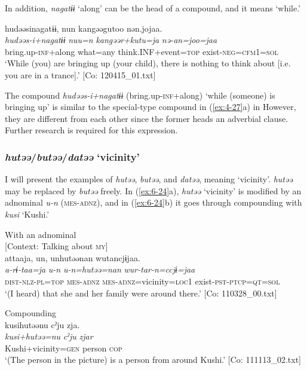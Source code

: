 In addition, \textit{nagatɨɨ} ‘along’ can be the head of a compound, and it means ‘while.’

\ea\label{ex:6-23}
{\TM}
\glll hudəəsinagatɨɨ,  nun  kangəəgutoo  nən.jojaa.\\
\textit{hudəəs-i+nagatɨɨ}  \textit{nuu=n}  \textit{kangəər+kutu=ja}  \textit{nə-an=joo=jaa}\\
    bring.up-\textsc{inf}+along  what=any  think.INF+event=\textsc{top}  exist-\textsc{neg}=\textsc{cfm}1=\textsc{sol}\\
\glt    ‘While (you) are bringing up (your child), there is nothing to think about [i.e. you are in a trance].’ [Co: 120415\_01.txt]
\z

The compound \textit{hudəəs-i+nagatɨɨ} (bring.up-\textsc{inf}+along) ‘while (someone) is bringing up’ is similar to the special-type compound in (\ref{ex:4-27}a) in  However, they are different from each other since the former heads an adverbial clause. Further research is required for this expression.

\subsubsection{\textit{hutəə}/\textit{butəə}/\textit{datəə} ‘vicinity’}

I will present the examples of \textit{hutəə}, \textit{butəə}, and \textit{datəə}, meaning ‘vicinity’. \textit{hutəə} may be replaced by \textit{butəə} freely. In (\ref{ex:6-24}a), \textit{hutəə} ‘vicinity’ is modified by an adnominal \textit{u-n} (\textsc{mes}-\textsc{adnz}), and in (\ref{ex:6-24}b) it goes through compounding with \textit{kusi} ‘Kushi.’

\ea\label{ex:6-24}
\ea With an adnominal\\{}
[Context: Talking about \textsc{my}]\\
{\TM}
\glll attaaja,  un,  unhutəənan   wutancjɨjaa.\\
      \textit{a-rɨ-taa=ja}  \textit{u-n}  \textit{u-n=hutəə=nan} \textit{wur-tar-n=ccjɨ=jaa}\\
      \textsc{dist}-\textsc{nlz}-\textsc{pl}=\textsc{top}  \textsc{mes}-\textsc{adnz}  \textsc{mes}-\textsc{adnz}=vicinity=\textsc{loc1}     exist-\textsc{pst}-\textsc{ptcp}=\textsc{qt}=\textsc{sol}\\
\glt ‘(I heard) that she and her family were around there.’ [Co: 110328\_00.txt]
\z

\ex Compounding\\
{\TM}
\glll  kusihutəənu  cˀju  zja.\\
\textit{kusi+hutəə=nu}  \textit{cˀju}  \textit{zjar}\\
Kushi+vicinity=\textsc{gen}  person  \textsc{cop}\\
\glt ‘(The person in the picture) is a person from around Kushi.’ [Co: 111113\_02.txt]
\z

